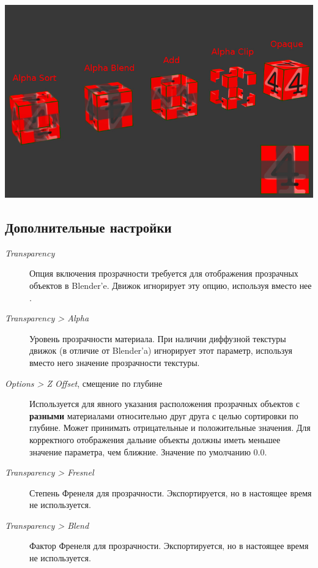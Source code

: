 \documentclass[a4paper,12pt,oneside]{sphinxmanual}
\begin{document}
{\hfill\includegraphics[width=1.000\linewidth]{alpha_types.jpg}\hfill}


\subsection{Дополнительные настройки}
\label{materials:index-4}\label{materials:id5}\begin{description}
\item[{\emph{Transparency}}] \leavevmode
Опция включения прозрачности требуется для отображения прозрачных объектов в Blender'e. Движок игнорирует эту опцию, используя вместо нее .

\item[{\emph{Transparency \textgreater{} Alpha}}] \leavevmode
Уровень прозрачности материала. При наличии диффузной текстуры движок (в отличие от Blender'a) игнорирует этот параметр, используя вместо него значение прозрачности текстуры.

\item[{\emph{Options \textgreater{} Z Offset}, смещение по глубине}] \leavevmode
Используется для явного указания расположения прозрачных объектов с \textbf{разными} материалами относительно друг друга с целью сортировки по глубине. Может принимать отрицательные и положительные значения. Для корректного отображения дальние объекты должны иметь меньшее значение параметра, чем ближние. Значение по умолчанию 0.0.

\item[{\emph{Transparency \textgreater{} Fresnel}}] \leavevmode
Степень Френеля для прозрачности. Экспортируется, но в настоящее время не используется.

\item[{\emph{Transparency \textgreater{} Blend}}] \leavevmode
Фактор Френеля для прозрачности. Экспортируется, но в настоящее время не используется.

\end{description}
\end{document}

